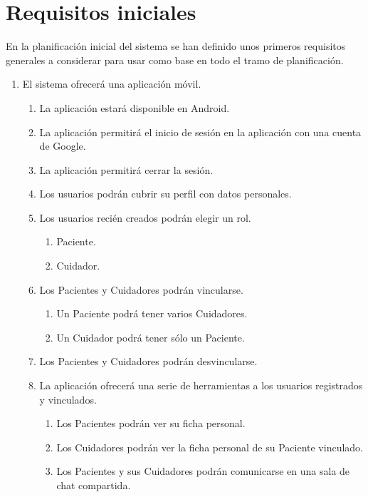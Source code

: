 \chapter{Requisitos iniciales}
\label{ch:requisitos_iniciales}

En la planificación inicial del sistema se han definido unos primeros requisitos generales a considerar para usar como base en todo el tramo de planificación.

\begin{enumerate}[label*=RI\arabic*.]
    \item El sistema ofrecerá una aplicación móvil.
    \begin{enumerate}[label*=\arabic*.]
        \item La aplicación estará disponible en Android.
        \item La aplicación permitirá el inicio de sesión en la aplicación con una cuenta de Google.
        \item La aplicación permitirá cerrar la sesión.
        \item Los usuarios podrán cubrir su perfil con datos personales.
        \item Los usuarios recién creados podrán elegir un rol.
        \begin{enumerate}[label*=\arabic*.]
            \item Paciente.
            \item Cuidador.
        \end{enumerate}
        \item Los Pacientes y Cuidadores podrán vincularse.
        \begin{enumerate}[label*=\arabic*.]
            \item Un Paciente podrá tener varios Cuidadores.
            \item Un Cuidador podrá tener sólo un Paciente.
        \end{enumerate}
        \item Los Pacientes y Cuidadores podrán desvincularse.
        \item La aplicación ofrecerá una serie de herramientas a los usuarios registrados y vinculados.
        \begin{enumerate}[label*=\arabic*.]
            \item Los Pacientes podrán ver su ficha personal.
            \item Los Cuidadores podrán ver la ficha personal de su Paciente vinculado.
            \item Los Pacientes y sus Cuidadores podrán comunicarse en una sala de chat compartida.

\end{enumerate}
\end{enumerate}
\end{enumerate}
